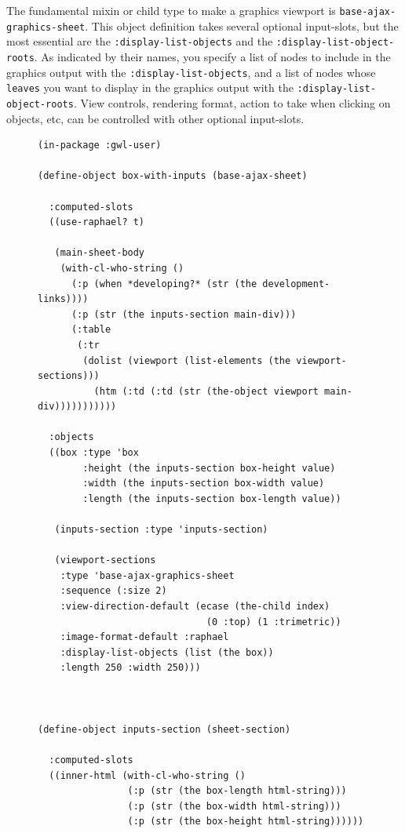 \documentclass [11pt]{book}
\begin{document}
\label{subsec:includinggraphics}



The fundamental mixin or child type to make a graphics viewport is \texttt{base-ajax-graphics-sheet}. This object definition takes several optional input-slots, but the most essential are the \texttt{:display-list-objects} and the \texttt{:display-list-object-roots}. As indicated by their names, you specify a list of nodes to include in
the graphics output with the \texttt{:display-list-objects}, and a list of nodes whose \texttt{leaves} you want to display in the graphics output with the \texttt{:display-list-object-roots}. View controls, rendering format, action to take when clicking on objects, etc, 
can be controlled with other optional input-slots.


\begin{figure}
\begin{lrbox}{\boxedverb}
\begin{minipage}{\linewidth}
\tiny{

\begin{verbatim}(in-package :gwl-user)

(define-object box-with-inputs (base-ajax-sheet)
  
  :computed-slots
  ((use-raphael? t)
   
   (main-sheet-body 
    (with-cl-who-string ()
      (:p (when *developing?* (str (the development-links))))
      (:p (str (the inputs-section main-div)))
      (:table
       (:tr
        (dolist (viewport (list-elements (the viewport-sections)))
          (htm (:td (:td (str (the-object viewport main-div)))))))))))
  
  :objects
  ((box :type 'box
        :height (the inputs-section box-height value)
        :width (the inputs-section box-width value)
        :length (the inputs-section box-length value))
   
   (inputs-section :type 'inputs-section)

   (viewport-sections
    :type 'base-ajax-graphics-sheet
    :sequence (:size 2)
    :view-direction-default (ecase (the-child index)
                              (0 :top) (1 :trimetric))
    :image-format-default :raphael
    :display-list-objects (list (the box))
    :length 250 :width 250)))
  

 
(define-object inputs-section (sheet-section)
  
  :computed-slots
  ((inner-html (with-cl-who-string ()
                (:p (str (the box-length html-string)))
                (:p (str (the box-width html-string)))
                (:p (str (the box-height html-string))))))


\end{verbatim}}
\end{minipage}
\end{lrbox}
\end{figure}
\end{document}
